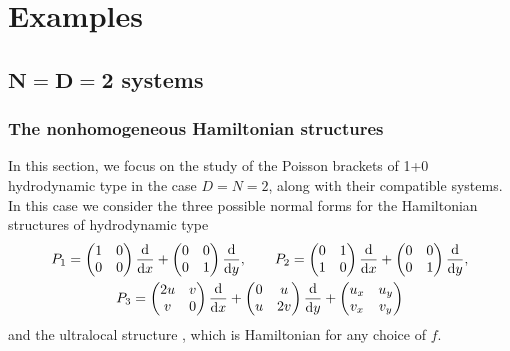 \documentclass[10pt,a4paper]{amsart}
\numberwithin{equation}{section}
\begin{document}
\section{Examples}
\subsection[N=D=2 systems]{$\boldsymbol{N=D=2}$ systems}
\subsubsection{The nonhomogeneous Hamiltonian structures}
In this section, we focus on the study of the Poisson brackets of 1+0 hydrodynamic type in the case $D=N=2$, along with their compatible systems. In this case we consider the three possible normal forms for the Hamiltonian structures of hydrodynamic type \cite{ferapontov2011classification,mokhov2008classification}
\begin{gather*}
P_1=\begin{pmatrix} 1&0\\0&0\\ \end{pmatrix} \frac{\rm d}{{\rm d}x}+\begin{pmatrix} 0&0\\0&1\\ \end{pmatrix} \frac{\rm d}{{\rm d}y},\qquad
P_2=\begin{pmatrix} 0&1\\1&0\\ \end{pmatrix} \frac{\rm d}{{\rm d}x}+\begin{pmatrix} 0&0\\0&1\\ \end{pmatrix} \frac{\rm d}{{\rm d}y},\\
P_3=\begin{pmatrix} 2u&v\\v&0\\ \end{pmatrix} \frac{\rm d}{{\rm d}x}+\begin{pmatrix} 0&u\\u&2v\\ \end{pmatrix} \frac{\rm d}{{\rm d}y}+\begin{pmatrix} u_x&u_y\\v_x&v_y\\ \end{pmatrix}
\end{gather*}
and the ultralocal structure
,
which is Hamiltonian for any choice of $f$.
\end{document}
